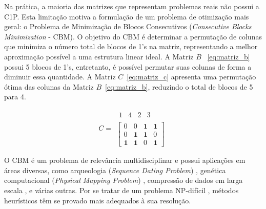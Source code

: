 Na prática, a maioria das matrizes que representam problemas reais não possui a C1P. Esta limitação motiva a formulação de um problema de otimização mais geral: o Problema de Minimização de Blocos Consecutivos (\textit{Consecutive Blocks Minimization} - CBM). O objetivo do CBM é determinar a permutação de colunas que minimiza o número total de blocos de 1's na matriz, representando a melhor aproximação possível a uma estrutura linear ideal. A Matriz $B$ ~\eqref{eq:matriz_b} possui 5 blocos de 1's, entretanto, é possível permutar suas colunas de forma a diminuir essa quantidade. A Matriz $C$~\eqref{eq:matriz_c} apresenta uma permutação ótima das colunas da Matriz $B$~\eqref{eq:matriz_b}, reduzindo o total de blocos de 5 para 4.

\begin{figure}[h!] %
    \centering
    \begin{minipage}{0.4\textwidth}
        \centering
        \begin{equation} \label{eq:matriz_c}
            C =
            \begin{array}{c}
                \begin{array}{cccc}
                    1 & 4 & 2 & 3
                \end{array} \\[3pt]
                \left[
                    \begin{array}{cccc}
                        0          & 0          & \mathbf{1} & \mathbf{1} \\
                        0          & \mathbf{1} & \mathbf{1} & 0          \\
                        \mathbf{1} & \mathbf{1} & 0          & \mathbf{1}
                    \end{array}
                    \right]
            \end{array}
        \end{equation}
    \end{minipage}
\end{figure}

O CBM é um problema de relevância multidisciplinar e possui aplicações em áreas diversas, como arqueologia (\textit{Sequence Dating Problem}) \cite{kendall1969incidence}, genética computacional (\textit{Physical Mapping Problem}) \cite{alizadeh1995physical}, compressão de dados em larga escala \cite{lemire2011reordering}, e várias outras. Por se tratar de um problema NP-difícil \cite{kou1977polynomial}, métodos heurísticos têm se provado mais adequados à sua resolução.

